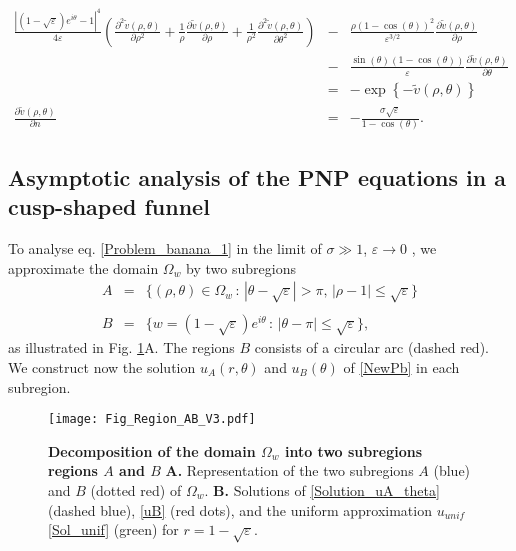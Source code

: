 \documentclass[12pt]{article}
\newcommand{\beq}{\begin{eqnarray}}
\newcommand{\eeq}{\end{eqnarray}}
\newcommand{\p}{\partial}
\newcommand{\eps}{\varepsilon}
\begin{document}
{\small
\beq\label{Problem_banana_1}
\frac{|(1-\sqrt{\eps})e^{i\theta}-1|^4}{4\eps}\left(\frac{\p^2 \tilde v(\rho,\theta)}{\p \rho^2}+\frac{1}{\rho}\frac{\p\tilde v(\rho,\theta)}{\p \rho}+\frac{1}{\rho^2}\frac{\p^2\tilde v(\rho,\theta)}{\p \theta^2} \right) &-&\frac{ \rho(1-\cos(\theta))^2}{\eps^{3/2}}\frac{\p\tilde v (\rho,\theta  )}{\p\rho} \nonumber\\
&-&\frac{\sin(\theta)(1-\cos(\theta))}{\eps}\frac{\p\tilde v (\rho,\theta  )}{\p\theta}\nonumber\\
&=&-\exp\left\{-\tilde v(\rho,\theta) \right\}\nonumber\\
\frac{\p\tilde v(\rho,\theta) }{\p n}&=&-\frac{\sigma\sqrt{\eps}}{  1-\cos(\theta) }.
\eeq
}
\subsection{Asymptotic analysis of the PNP equations in a cusp-shaped funnel}\label{s:Cusp_3D}
To analyse eq. \eqref{Problem_banana_1} in the limit of $\sigma \gg1$, $\eps\rightarrow 0$ \cite{PhysD2016}, we approximate the domain $\Omega_w$ by two subregions
\beq
A&=& \{ (\rho,\theta)\in \Omega_w \,: \, |\theta-\sqrt{\eps}|>\pi,\, |\rho-1|\leq\sqrt{\eps}  \}\\
\nonumber\\
B&=& \{ w=(1-\sqrt{\eps})e^{i\theta}\,: \, |\theta-\pi|\leq\sqrt{\eps}\}, \nonumber
\eeq
as  illustrated in Fig. \ref{f:RegionsAB}A. The regions $B$ consists of a circular arc (dashed red).  We construct now the solution $u_A(r, \theta)$ and $u_B(\theta)$ of \eqref{NewPb} in each subregion.
\begin{figure}[http!]
	\center
	\texttt{[image: Fig\_Region\_AB\_V3.pdf]}
	\caption{\small  { {\bf Decomposition of the domain $\Omega_w$ into two subregions regions $A$ and $B$ }
			{\bf A.} Representation of the two subregions
			$A$ (blue) and $B$ (dotted red) of $\Omega_w$.
			{\bf B.} Solutions of \eqref{Solution_uA_theta} (dashed blue), \eqref{uB} (red dots), and the uniform approximation  $u_{unif}$ \eqref{Sol_unif} (green) for $r=1-\sqrt{\eps}$.}}
	\label{f:RegionsAB}
\end{figure}
\end{document}
